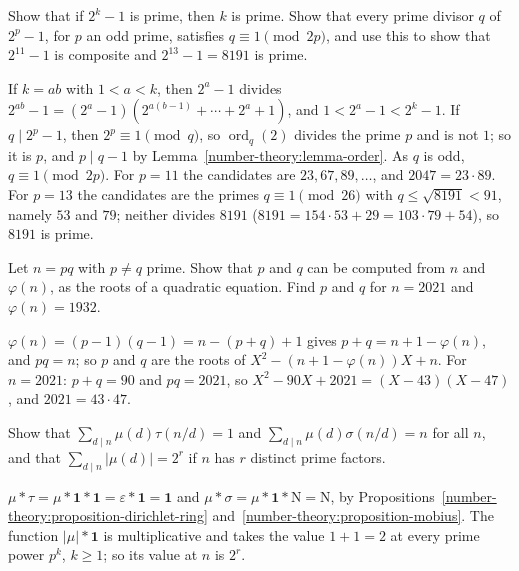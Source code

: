 \begin{exercise}\label{number-theory:exercise-mersenne}
Show that if $2^k - 1$ is prime, then $k$ is prime. Show that every prime divisor $q$ of $2^p - 1$, for $p$ an odd prime, satisfies $q \equiv 1 \pmod{2p}$, and use this to show that $2^{11} - 1$ is
composite and $2^{13} - 1 = 8191$ is prime.
\end{exercise}

\begin{solution}
If $k = ab$ with $1 < a < k$, then $2^a - 1$ divides $2^{ab} - 1 = (2^a - 1)(2^{a(b-1)} + \cdots + 2^a + 1)$, and $1 < 2^a - 1 < 2^k - 1$. If $q \mid 2^p - 1$, then $2^p \equiv 1 \pmod q$, so
$\operatorname{ord}_q(2)$ divides the prime $p$ and is not $1$; so it is $p$, and $p \mid q - 1$ by Lemma~\ref{number-theory:lemma-order}. As $q$ is odd, $q \equiv 1 \pmod{2p}$. For $p = 11$ the candidates
are $23, 67, 89, \ldots$, and $2047 = 23 \cdot 89$. For $p = 13$ the candidates are the primes $q \equiv 1 \pmod{26}$ with $q \leq \sqrt{8191} < 91$, namely $53$ and $79$; neither divides $8191$
($8191 = 154 \cdot 53 + 29 = 103 \cdot 79 + 54$), so $8191$ is prime.
\end{solution}

\begin{exercise}\label{number-theory:exercise-rsa-factoring}
Let $n = pq$ with $p \neq q$ prime. Show that $p$ and $q$ can be computed from $n$ and $\varphi(n)$, as the roots of a quadratic equation. Find $p$ and $q$ for $n = 2021$ and $\varphi(n) = 1932$.
\end{exercise}

\begin{solution}
$\varphi(n) = (p - 1)(q - 1) = n - (p + q) + 1$ gives $p + q = n + 1 - \varphi(n)$, and $pq = n$; so $p$ and $q$ are the roots of $X^2 - (n + 1 - \varphi(n))X + n$. For $n = 2021$: $p + q = 90$ and
$pq = 2021$, so $X^2 - 90X + 2021 = (X - 43)(X - 47)$, and $2021 = 43 \cdot 47$.
\end{solution}

\begin{exercise}\label{number-theory:exercise-mobius-sum}
Show that $\sum_{d \mid n}\mu(d)\tau(n/d) = 1$ and $\sum_{d \mid n}\mu(d)\sigma(n/d) = n$ for all $n$, and that $\sum_{d \mid n}|\mu(d)| = 2^r$ if $n$ has $r$ distinct prime factors.
\end{exercise}

\begin{solution}
$\mu * \tau = \mu * \mathbf{1} * \mathbf{1} = \varepsilon * \mathbf{1} = \mathbf{1}$ and $\mu * \sigma = \mu * \mathbf{1} * \mathrm{N} = \mathrm{N}$, by Propositions~\ref{number-theory:proposition-dirichlet-ring}
and~\ref{number-theory:proposition-mobius}. The function $|\mu| * \mathbf{1}$ is multiplicative and takes the value $1 + 1 = 2$ at every prime power $p^k$, $k \geq 1$; so its value at $n$ is $2^r$.
\end{solution}

